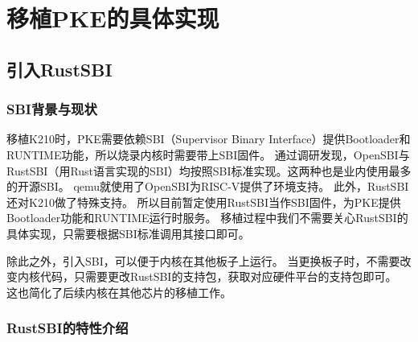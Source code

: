 \chapter{移植PKE的具体实现}

\section{引入RustSBI}

\subsection{SBI背景与现状}

移植K210时，PKE需要依赖SBI（Supervisor Binary Interface）提供Bootloader和RUNTIME功能，所以烧录内核时需要带上SBI固件。
通过调研发现，OpenSBI与RustSBI（用Rust语言实现的SBI）均按照SBI标准实现。这两种也是业内使用最多的开源SBI。
qemu就使用了OpenSBI为RISC-V提供了环境支持。
此外，RustSBI还对K210做了特殊支持。
所以目前暂定使用RustSBI当作SBI固件，为PKE提供Bootloader功能和RUNTIME运行时服务。
移植过程中我们不需要关心RustSBI的具体实现，只需要根据SBI标准调用其接口即可。

除此之外，引入SBI，可以便于内核在其他板子上运行。
当更换板子时，不需要改变内核代码，只需要更改RustSBI的支持包，获取对应硬件平台的支持包即可。
这也简化了后续内核在其他芯片的移植工作。

\subsection{RustSBI的特性介绍}

